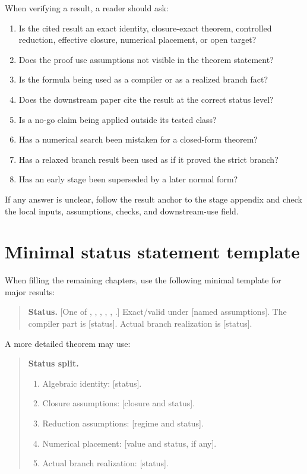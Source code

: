 When verifying a result, a reader should ask:
\begin{enumerate}[leftmargin=2.2em]
  \item Is the cited result an exact identity, closure-exact theorem, controlled reduction, effective closure, numerical placement, or open target?
  \item Does the proof use assumptions not visible in the theorem statement?
  \item Is the formula being used as a compiler or as a realized branch fact?
  \item Does the downstream paper cite the result at the correct status level?
  \item Is a no-go claim being applied outside its tested class?
  \item Has a numerical search been mistaken for a closed-form theorem?
  \item Has a relaxed branch result been used as if it proved the strict branch?
  \item Has an early stage been superseded by a later normal form?
\end{enumerate}

If any answer is unclear, follow the result anchor to the stage appendix and check the local inputs, assumptions, checks, and downstream-use field.

\section{Minimal status statement template}
\label{sec:minimal-status-template}

When filling the remaining chapters, use the following minimal template for major results:
\begin{quote}
\textbf{Status.}  [One of \StatusExact, \StatusExactClosure, \StatusReduced, \StatusEffective, \StatusNumerical, \StatusOpen.]  Exact/valid under [named assumptions].  The compiler part is [status].  Actual branch realization is [status].
\end{quote}

A more detailed theorem may use:
\begin{quote}
\textbf{Status split.}
\begin{enumerate}[leftmargin=2.2em]
  \item Algebraic identity: [status].
  \item Closure assumptions: [closure and status].
  \item Reduction assumptions: [regime and status].
  \item Numerical placement: [value and status, if any].
  \item Actual branch realization: [status].
\end{enumerate}
\end{quote}

